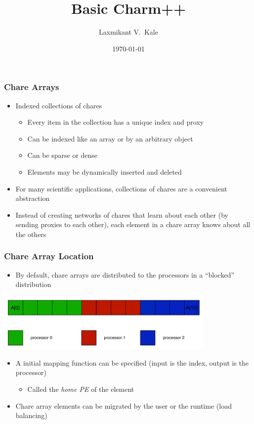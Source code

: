 \documentclass{beamer}
\title{Basic Charm++}
\author[Laxmikant V.~Kale]{
Laxmikant V.~Kale
}
\date{\today}
\begin{document}
\begin{frame}[fragile]
  \frametitle{Chare Arrays}
  \begin{itemize}
    \item Indexed collections of chares
      \begin{itemize}
      \item Every item in the collection has a unique index and proxy
      \item Can be indexed like an array or by an arbitrary object
      \item Can be sparse or dense
      \item Elements may be dynamically inserted and deleted
      \end{itemize}
    \item For many scientific applications, collections of chares are a
      convenient abstraction
    \item Instead of creating networks of chares that learn about each other
      (by sending proxies to each other), each element in a chare array knows
      about all the others
  \end{itemize}
\end{frame}

\begin{frame}
  \frametitle{Chare Array Location}
  \begin{itemize}
  \item By default, chare arrays are distributed to the processors in a
    ``blocked'' distribution
  \end{itemize}
  \begin{center} \includegraphics[width=0.8\textwidth]{figures/blockedDist.pdf} \end{center}
  \begin{itemize}
  \item A initial mapping function can be specified (input is the index, output
    is the processor)
    \begin{itemize}
    \item Called the \emph{home PE} of the element
    \end{itemize}
  \item Chare array elements can be migrated by the user or the runtime (load balancing)
  \end{itemize}
\end{frame}
\end{document}

